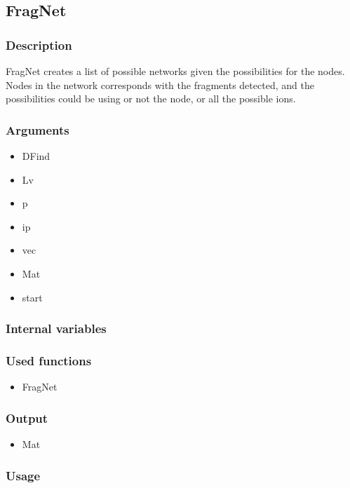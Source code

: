 \subsection{FragNet}\label{FragNet}
\subsubsection{Description}
FragNet creates a list of possible networks given the possibilities for the nodes. Nodes in the network corresponds with the fragments detected, and the possibilities could be using or not the node, or all the possible ions. 
\subsubsection{Arguments}
\begin{itemize}
\item DFind
\item Lv
\item p
\item ip
\item vec
\item Mat
\item start
\end{itemize}
\subsubsection{Internal variables}
\subsubsection{Used functions}
\begin{itemize}
\item FragNet
\end{itemize}
\subsubsection{Output}
\begin{itemize}
\item Mat
\end{itemize}
\subsubsection{Usage}



